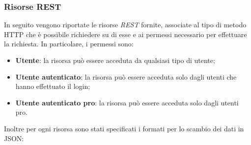 \subsubsection{Risorse REST}
In seguito vengono riportate le risorse \textit{REST} fornite, associate al tipo di metodo HTTP che è possibile richiedere su di esse e ai permessi necessario per effettuare la richiesta. In particolare, i permessi sono:
\begin{itemize}
	\item \textbf{Utente}: la risorsa può essere acceduta da qualsiasi tipo di utente;
	\item \textbf{Utente autenticato}: la risorsa può essere acceduta solo dagli utenti che hanno effettuato il login;
	\item \textbf{Utente autenticato pro}: la risorsa può essere acceduta solo dagli utenti pro.
\end{itemize}
Inoltre per ogni risorsa sono stati specificati i formati per lo scambio dei dati in JSON:
